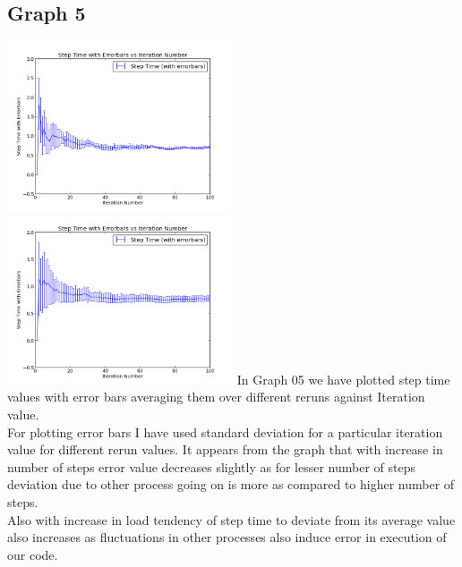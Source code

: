 \documentclass[11pt]{article}
\begin{document}
\subsection{Graph 5}
 \includegraphics[width=0.5\textwidth,keepaspectratio]{img/g08_plot04_low} \includegraphics[width=0.5\textwidth,keepaspectratio]{img/g08_plot04_high}
In Graph 05 we have plotted step time values with error bars averaging them over different reruns against Iteration value.\\
For plotting error bars I have used standard deviation for a particular iteration value for different rerun values. It appears from the graph that with increase in number of steps error value decreases slightly as for lesser number of steps deviation due to other process going on is more as compared to higher number of steps.\\
Also with increase in load tendency of step time to deviate from its average value also increases as fluctuations in other processes also induce error in execution of our code.\\
\end{document}
